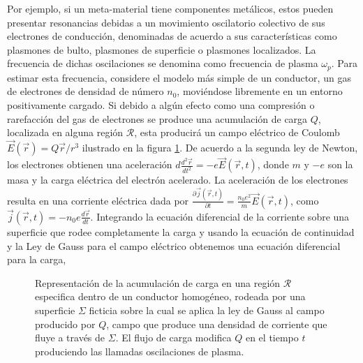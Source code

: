 \documentclass[12pt]{article}
\begin{document}
Por ejemplo, si un meta-material tiene componentes metálicos, estos
pueden presentar resonancias debidas a un movimiento oscilatorio
colectivo de sus electrones de conducción, denominadas de acuerdo a
sus características como plasmones de bulto, plasmones de superficie o
plasmones localizados. La frecuencia de dichas oscilaciones se
denomina como frecuencia de plasma $\omega_{p}$. Para estimar esta
frecuencia, considere el modelo más simple de un conductor, un gas de
electrones de densidad de número $n_{0}$, moviéndose libremente en un
entorno positivamente cargado. Si debido a algún efecto como una
compresión o rarefacción del gas de electrones se produce una
acumulación de carga $Q$, localizada en alguna región $\mathcal{R}$,
esta producirá un campo eléctrico de Coulomb $\vec{E} (\vec{r}) =
Q\vec{r}/r^{3} $ ilustrado en la figura \ref{Bulkplasmon}. De acuerdo
a la segunda ley de Newton, los electrones obtienen una aceleración
$d\frac{d^{2}\vec{r}}{dt^{2}} = -e\vec{E}(\vec{r},t)$, donde $m$ y
$-e$ son la masa y la carga eléctrica del electrón acelerado. La
aceleración de los electrones resulta en una corriente eléctrica dada
por $\frac{\partial \vec{j}(\vec{r},t)}{\partial t}=
\frac{n_{0}e^{2}}{m}\vec{E}(\vec{r},t)$, como $\vec{j}(\vec{r},t) =
-n_{0}e\frac{d\vec{r}}{dt}$. Integrando la ecuación diferencial de la
corriente sobre una superficie que rodee completamente la carga y
usando la ecuación de continuidad y la Ley de Gauss para el campo
eléctrico obtenemos una ecuación diferencial para la carga,
\begin{figure}
\centering

\label{Bulkplasmon}
\caption{Representación de la acumulación de carga en una región
  $\mathcal{R}$ especifica dentro de un conductor homogéneo, rodeada
  por una superficie $\Sigma $ ficticia sobre la cual se aplica la ley
  de Gauss al campo producido por $Q$, campo que produce una densidad
  de corriente que fluye a través de $\Sigma $. El flujo de carga
  modifica $Q$ en el tiempo $t$ produciendo las llamadas oscilaciones
  de plasma.}
\end{figure}
\end{document}
